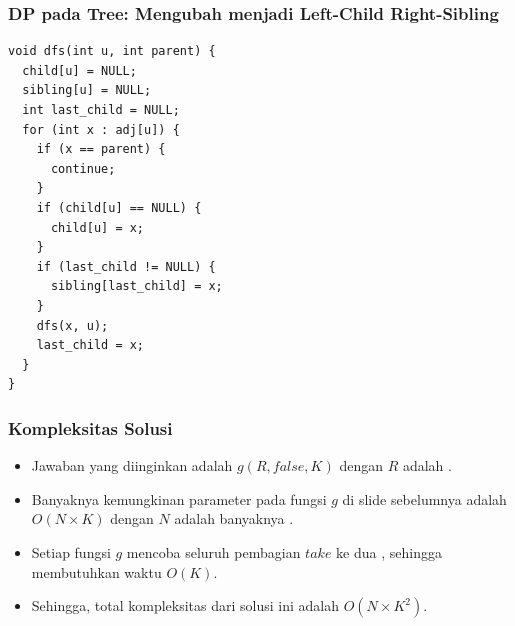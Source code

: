 \begin{frame}[fragile]
\frametitle{DP pada Tree: Mengubah menjadi Left-Child Right-Sibling}
\begin{lstlisting}
void dfs(int u, int parent) {
  child[u] = NULL;
  sibling[u] = NULL;
  int last_child = NULL;
  for (int x : adj[u]) { 
    if (x == parent) {
      continue;
    }
    if (child[u] == NULL) {
      child[u] = x;
    }
    if (last_child != NULL) {
      sibling[last_child] = x;
    }
    dfs(x, u);
    last_child = x;
  }
}
\end{lstlisting}
\end{frame}

\begin{frame}
\frametitle{Kompleksitas Solusi}
\begin{itemize}
  \item Jawaban yang diinginkan adalah $g(R, false, K)$ dengan $R$ adalah \froot \ftree.
  \item Banyaknya kemungkinan parameter pada fungsi $g$ di slide sebelumnya adalah $O(N \times K)$ dengan $N$ adalah banyaknya \fnode.
  \item Setiap fungsi $g$ mencoba seluruh pembagian $take$ ke dua \fnode, sehingga membutuhkan waktu $O(K)$.
  \item Sehingga, total kompleksitas dari solusi \fdp ini adalah $O(N \times K^2)$.
\end{itemize}
\end{frame}



